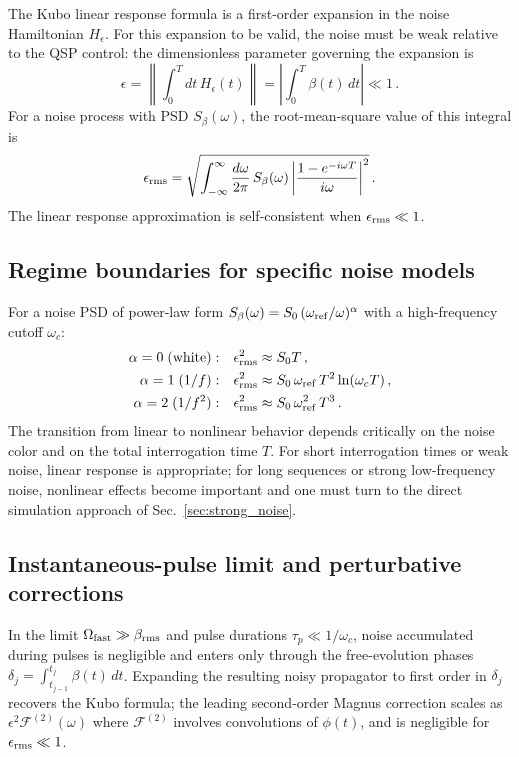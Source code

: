 \documentclass[aps,pra,twocolumn,superscriptaddress,longbibliography]{revtex4-2}
\newcommand{\be}{\begin{equation}}
\newcommand{\ee}{\end{equation}}
\begin{document}
The Kubo linear response formula is a first-order expansion in the noise Hamiltonian
$H_\epsilon$.
For this expansion to be valid, the noise must be weak relative to the QSP control:
the dimensionless parameter governing the expansion is
\be
  \epsilon = \left\|\int_0^T dt\, H_\epsilon(t)\right\| = \left|\int_0^T \beta(t)\,dt\right| \ll 1\,.
  \label{eq:pert_param}
\ee
For a noise process with PSD $S_\beta(\omega)$, the root-mean-square value of this
integral is
\be
  \epsilon_{\rm rms} = \sqrt{\int_{-\infty}^{\infty}\frac{d\omega}{2\pi}\,
    S_\beta(\omega)\left|\frac{1-e^{-i\omega T}}{i\omega}\right|^2}\,.
  \label{eq:epsilon_rms}
\ee
The linear response approximation is self-consistent when $\epsilon_{\rm rms} \ll 1$.

\subsection{Regime boundaries for specific noise models}

For a noise PSD of power-law form $S_\beta(\omega) = S_0\,(\omega_{\rm ref}/\omega)^\alpha$
with a high-frequency cutoff $\omega_c$:
\begin{align}
  \alpha = 0 \;(\text{white}): & \quad \epsilon_{\rm rms}^2 \approx S_0 T\,, \\
  \alpha = 1 \;(1/f): & \quad \epsilon_{\rm rms}^2 \approx S_0\,\omega_{\rm ref}\,T^2 \ln(\omega_c T)\,, \\
  \alpha = 2 \;(1/f^2): & \quad \epsilon_{\rm rms}^2 \approx S_0\,\omega_{\rm ref}^2\,T^3\,.
\end{align}
The transition from linear to nonlinear behavior depends critically on the noise color
and on the total interrogation time $T$.
For short interrogation times or weak noise, linear response is appropriate;
for long sequences or strong low-frequency noise, nonlinear effects become important
and one must turn to the direct simulation approach of Sec.~\ref{sec:strong_noise}.

\subsection{Instantaneous-pulse limit and perturbative corrections}
\label{sec:corrections}

In the limit $\Omega_{\rm fast} \gg \beta_{\rm rms}$ and pulse durations
$\tau_p \ll 1/\omega_c$, noise accumulated during pulses is negligible and enters
only through the free-evolution phases
$\delta_j = \int_{t_{j-1}}^{t_j} \beta(t)\,dt$.
Expanding the resulting noisy propagator to first order in $\delta_j$ recovers the
Kubo formula; the leading second-order Magnus correction scales as
$\epsilon^2\mathcal{F}^{(2)}(\omega)$ where $\mathcal{F}^{(2)}$ involves convolutions
of $\phi(t)$, and is negligible for $\epsilon_{\rm rms} \ll 1$.
\end{document}
